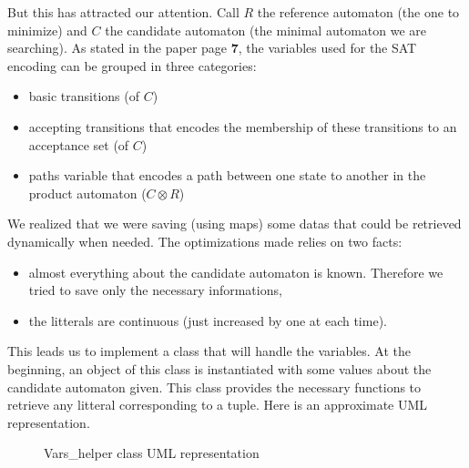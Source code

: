 But this has attracted our attention. Call $R$ the reference automaton (the one to minimize) and $C$
the candidate automaton (the minimal automaton we are searching). As stated in the
\cite{14} paper page \textbf{7}, the variables used for the SAT encoding can be grouped in three categories:

\begin{itemize}
 \item basic transitions (of $C$)
 \item accepting transitions that encodes the membership of these transitions to an acceptance set
       (of $C$)
 \item paths variable that encodes a path between one state to another in the product automaton
       ($C \otimes R$)
\end{itemize}

We realized that we were saving (using maps) some datas that could be retrieved dynamically when needed. The
optimizations made relies on two facts:
\begin{itemize}
 \item almost everything about the candidate automaton is known. Therefore we tried to save only the
       necessary informations,
 \item the litterals are continuous (just increased by one at each time).
\end{itemize}

\noindent This leads us to implement a class that will handle the variables. At the beginning, an object of
this class is instantiated with some values about the candidate automaton given. This class provides the
necessary functions to retrieve any litteral corresponding to a tuple. Here is an approximate UML
representation.\\

\begin{figure}[h]
  \centering
  \caption{Vars\_helper class UML representation}
  \label{fig:sat_uml}
\end{figure}

